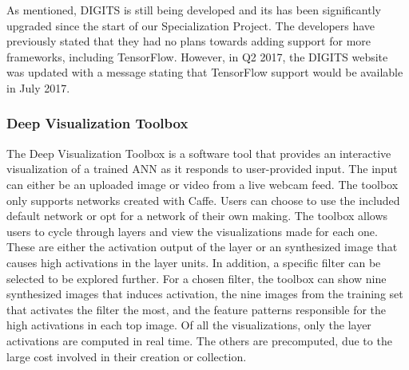 \noindent As mentioned, DIGITS is still being developed and its has been significantly upgraded since the start of our Specialization Project. The developers have previously stated that they had no plans towards adding support for more frameworks, including TensorFlow. However, in Q2 2017, the DIGITS website was updated with a message stating that TensorFlow support would be available in July 2017.

\begin{comment}
Drawbacks:
- Still does not support Keras.
- No advanced visualizations.
\end{comment}

\subsubsection{Deep Visualization Toolbox}

\begin{comment}
\textit{The Deep Visualization Toolbox \cite{yosinski-deepvis} is a software tool that provides an interactive visualization of a trained artificial convolutional neural network as the network responds to user-provided input, either an uploaded image or video from a live webcam feed. The toolbox is developed for networks created in Caffe. It comes with a default network, but also includes the possibility of adapting your own networks. Users can view the filters of a selected layer, either as actual activations or as images synthesized to produce high activations through deep visualization. A specific neuron can be selected to explore further. This will show deep visualizations, the top nine images from the training set that activates the filter the most, and the pixels from those images most responsible for the high activations, computed via the deconvolution technique. Note that these last three visualizations are pre computed instead of computed in real time, since they are far too expensive to run live.}
\end{comment}

The Deep Visualization Toolbox is a software tool that provides an interactive visualization of a trained ANN as it responds to user-provided input. The input can either be an uploaded image or video from a live webcam feed. The toolbox only supports networks created with Caffe. Users can choose to use the included default network or opt for a network of their own making. The toolbox allows users to cycle through layers and view the visualizations made for each one. These are either the activation output of the layer or an synthesized image that causes high activations in the layer units. In addition, a specific filter can be selected to be explored further. For a chosen filter, the toolbox can show nine synthesized images that induces activation, the nine images from the training set that activates the filter the most, and the feature patterns responsible for the high activations in each top image. Of all the visualizations, only the layer activations are computed in real time. The others are precomputed, due to the large cost involved in their creation or collection. 

